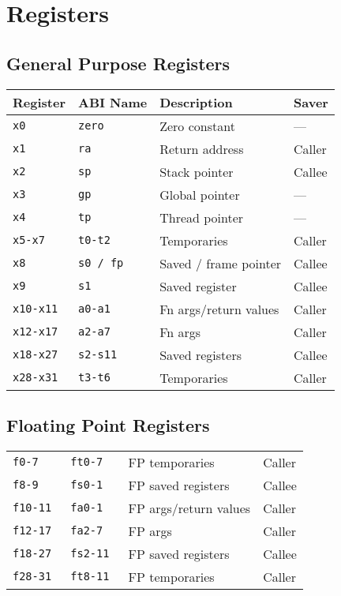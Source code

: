 \section*{Registers}

\subsection*{General Purpose Registers}

\begin{tabular} {l | l | l | l} \hline
Register     & ABI Name     & Description           & Saver  \\ \hline
\tt{x0}      & \tt{zero}    & Zero constant         & ---    \\
\tt{x1}      & \tt{ra}      & Return address        & Caller \\
\tt{x2}      & \tt{sp}      & Stack pointer         & Callee \\
\tt{x3}      & \tt{gp}      & Global pointer        & ---    \\
\tt{x4}      & \tt{tp}      & Thread pointer        & ---    \\
\tt{x5-x7}   & \tt{t0-t2}   & Temporaries           & Caller \\
\tt{x8}      & \tt{s0 / fp} & Saved / frame pointer & Callee \\
\tt{x9}      & \tt{s1}      & Saved register        & Callee \\
\tt{x10-x11} & \tt{a0-a1}   & Fn args/return values & Caller \\
\tt{x12-x17} & \tt{a2-a7}   & Fn args               & Caller \\
\tt{x18-x27} & \tt{s2-s11}  & Saved registers       & Callee \\
\tt{x28-x31} & \tt{t3-t6}   & Temporaries           & Caller \\ \hline
\end{tabular}

\subsection*{Floating Point Registers}

\begin{tabular} {l | l | l | l} \hline
\tt{f0-7}    & \tt{ft0-7}   & FP temporaries        & Caller \\
\tt{f8-9}    & \tt{fs0-1}   & FP saved registers    & Callee \\
\tt{f10-11}  & \tt{fa0-1}   & FP args/return values & Caller \\
\tt{f12-17}  & \tt{fa2-7}   & FP args               & Caller \\
\tt{f18-27}  & \tt{fs2-11}  & FP saved registers    & Callee \\
\tt{f28-31}  & \tt{ft8-11}  & FP temporaries        & Caller \\ \hline
\end{tabular}

